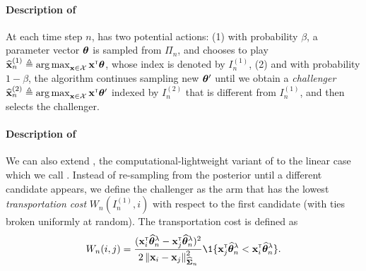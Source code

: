 \paragraph{Description of \LTCS} At each time step $n$, \LTCS has two potential actions: (1) with probability $\beta$, a parameter vector ${\boldsymbol \theta}$ is sampled from $\Pi_{n}$, and \LTCS chooses to play $\widehat{{\bf x}}_n^{(1)} \triangleq \operatorname*{arg\,max}_{{\bf x}\in\mathcal{X}} {\bf x}^\mathsf{\scriptscriptstyle T}{\boldsymbol \theta}$, whose index is denoted by $I_n^{(1)}$, (2) and with probability $1-\beta$, the algorithm continues sampling new ${\boldsymbol \theta}'$ until we obtain a \emph{challenger} $\widehat{{\bf x}}_n^{(2)} \triangleq \operatorname*{arg\,max}_{{\bf x}\in\mathcal{X}} {\bf x}^\mathsf{\scriptscriptstyle T}{\boldsymbol \theta}'$ indexed by $I_n^{(2)}$ that is different from $I_n^{(1)}$, and \LTCS then selects the challenger.

\paragraph{Description of \LTCC} We can also extend \TCC, the computational-lightweight variant of \TTTS to the linear case which we call \LTCC. Instead of re-sampling from the posterior until a different candidate appears, we define the challenger as the arm that has the lowest \emph{transportation cost} $W_n(I_n^{(1)},i)$ with respect to the first candidate (with ties broken uniformly at random). The transportation cost is defined as
\begin{align}\label{def:transportation}
    W_n(i,j) = \dfrac{(\bx_i\transpose\hat{\btheta}^\lambda_n-\bx_j\transpose\hat{\btheta}^\lambda_n)^2}{2\normm{\bx_i-\bx_j}_{\hat{\bSigma}_n}^2}\1\{\bx_j\transpose\hat{\btheta}^\lambda_n<\bx_i\transpose\hat{\btheta}^\lambda_n\}.
\end{align}

